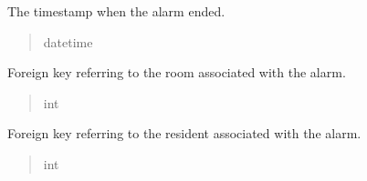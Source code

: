 \documentclass[letterpaper,10pt,english]{sphinxmanual}
\begin{document}
\begin{fulllineitems}
\begin{fulllineitems}
\begin{quote}
\begin{description}
\end{description}\end{quote}

\end{fulllineitems}


\begin{fulllineitems}
\label{\detokenize{app.models:app.models.alarm.Alarm.end}}
\pysigstartsignatures
\pysigline
{}
\pysigstopsignatures
\sphinxAtStartPar
The timestamp when the alarm ended.
\begin{quote}\begin{description}
\sphinxAtStartPar
datetime

\end{description}\end{quote}

\end{fulllineitems}


\begin{fulllineitems}
\label{\detokenize{app.models:app.models.alarm.Alarm.idRoom}}
\pysigstartsignatures
\pysigline
{}
\pysigstopsignatures
\sphinxAtStartPar
Foreign key referring to the room associated with the alarm.
\begin{quote}\begin{description}
\sphinxAtStartPar
int

\end{description}\end{quote}

\end{fulllineitems}


\begin{fulllineitems}
\label{\detokenize{app.models:app.models.alarm.Alarm.idResident}}
\pysigstartsignatures
\pysigline
{}
\pysigstopsignatures
\sphinxAtStartPar
Foreign key referring to the resident associated with the alarm.
\begin{quote}\begin{description}
\sphinxAtStartPar
int


\end{description}
\end{quote}
\end{fulllineitems}
\end{fulllineitems}
\end{document}

